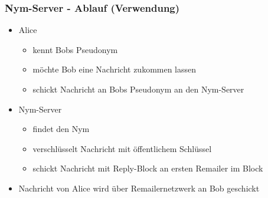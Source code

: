 \documentclass{beamer}
\begin{document}
\begin{frame}
	\frametitle{Nym-Server - Ablauf (Verwendung)}

	\begin{itemize}
		\item Alice 
		\begin{itemize}
			\item kennt Bobs Pseudonym
			\item möchte Bob eine Nachricht zukommen lassen
			\item schickt Nachricht an Bobs Pseudonym an den Nym-Server
		\end{itemize}

		\pause

		\item Nym-Server
		\begin{itemize}
			\item findet den Nym
			\item verschlüsselt Nachricht mit öffentlichem Schlüssel
			\item schickt Nachricht mit Reply-Block an ersten Remailer im Block
		\end{itemize}

		\item Nachricht von Alice wird über Remailernetzwerk an Bob geschickt
	\end{itemize}
\end{frame}
\end{document}
